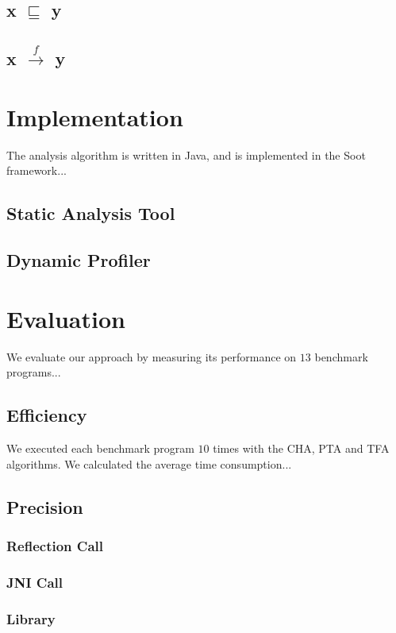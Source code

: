 \documentclass[review]{elsarticle}
\newcommand{\less}{\sqsubseteq}
\newcommand{\hflow}{\longrightarrow}
\newcommand{\lhflow}[1]{\stackrel{#1}{\hflow}}
\begin{document}
\subsection{x $\less$ y}
\subsection{x $\lhflow{f}$ y}

\section{Implementation}\label{sec:implementation}
The analysis algorithm is written in Java, and is implemented in the Soot framework...

\subsection{Static Analysis Tool}\label{subsec:static-analysis-tool}

\subsection{Dynamic Profiler}\label{subsec:dynamic-profiler}

\section{Evaluation}\label{sec:evaluation}
We evaluate our approach by measuring its performance on $13$ benchmark programs...
\subsection{Efficiency}\label{subsec:efficiency}
We executed each benchmark program $10$ times with the CHA, PTA and TFA algorithms. We calculated the average time consumption...
\subsection{Precision}\label{subsec:precision}
\subsubsection{Reflection Call}\label{subsubsec:reflection-call}
\subsubsection{JNI Call}\label{subsubsec:jni-call}
\subsubsection{Library}\label{subsubsec:library}
\end{document}
